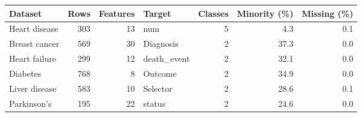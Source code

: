\begin{tabular}{lrrlrrr}
\toprule
Dataset & Rows & Features & Target & Classes & Minority (\%) & Missing (\%) \\
\midrule
Heart disease & 303 & 13 & num & 5 & 4.3 & 0.1 \\
Breast cancer & 569 & 30 & Diagnosis & 2 & 37.3 & 0.0 \\
Heart failure & 299 & 12 & death\_event & 2 & 32.1 & 0.0 \\
Diabetes & 768 & 8 & Outcome & 2 & 34.9 & 0.0 \\
Liver disease & 583 & 10 & Selector & 2 & 28.6 & 0.1 \\
Parkinson's & 195 & 22 & status & 2 & 24.6 & 0.0 \\
\bottomrule
\end{tabular}
